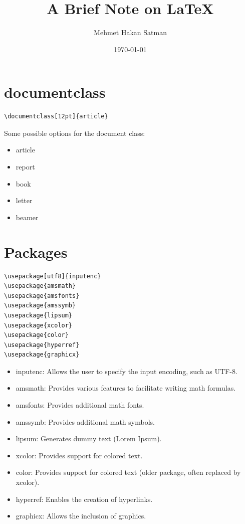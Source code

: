 \documentclass[12pt]{article}
\title{A Brief Note on \LaTeX}
\author{Mehmet Hakan Satman}
\date{\today}
\begin{document}
\maketitle
\newpage
\tableofcontents
\newpage
\listoftables
\newpage
\listoffigures
\newpage



\section{documentclass}

\begin{verbatim}
\documentclass[12pt]{article}
\end{verbatim}

Some possible options for the document class:

\begin{itemize}
\item article
\item report
\item book
\item letter
\item beamer
\end{itemize}

\section{Packages}
\begin{verbatim}
\usepackage[utf8]{inputenc}
\usepackage{amsmath}
\usepackage{amsfonts}
\usepackage{amssymb}
\usepackage{lipsum}
\usepackage{xcolor}
\usepackage{color}
\usepackage{hyperref}
\usepackage{graphicx}
\end{verbatim}  

\begin{itemize}
    \item inputenc: Allows the user to specify the input encoding, such as UTF-8.
    \item amsmath: Provides various features to facilitate writing math formulas.
    \item amsfonts: Provides additional math fonts.
    \item amssymb: Provides additional math symbols.
    \item lipsum: Generates dummy text (Lorem Ipsum).
    \item xcolor: Provides support for colored text.
    \item color: Provides support for colored text (older package, often replaced by xcolor).
    \item hyperref: Enables the creation of hyperlinks.
    \item graphicx: Allows the inclusion of graphics.
\end{itemize}
\end{document}
